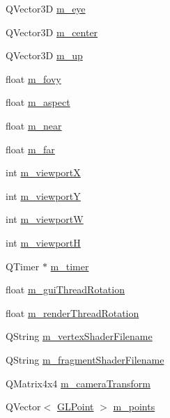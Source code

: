 \begin{DoxyCompactItemize}
\item 
Q\+Vector3D \mbox{\hyperlink{class_g_l_item_a586ce733c3f1509966d0d0aaf7edde0d}{m\+\_\+eye}}
\item 
Q\+Vector3D \mbox{\hyperlink{class_g_l_item_a2dc1570f2e0680183451cb59545c0c94}{m\+\_\+center}}
\item 
Q\+Vector3D \mbox{\hyperlink{class_g_l_item_abeb358b4ad8161c9837e875fe19da5ee}{m\+\_\+up}}
\item 
float \mbox{\hyperlink{class_g_l_item_a77f1d70315398888649ae325745cec2d}{m\+\_\+fovy}}
\item 
float \mbox{\hyperlink{class_g_l_item_a497f7f25c40790bf88b354b6ea432512}{m\+\_\+aspect}}
\item 
float \mbox{\hyperlink{class_g_l_item_ac811c5b957f441dedd62736a8feecb80}{m\+\_\+near}}
\item 
float \mbox{\hyperlink{class_g_l_item_ad5271d1dadd0691f4312fffe609ed93f}{m\+\_\+far}}
\item 
int \mbox{\hyperlink{class_g_l_item_a6f01d6d9f59a2c151ba7ceef071b1689}{m\+\_\+viewportX}}
\item 
int \mbox{\hyperlink{class_g_l_item_ae80eb4ae45d65460db5535598b54a873}{m\+\_\+viewportY}}
\item 
int \mbox{\hyperlink{class_g_l_item_a7941d53165e82da781e98f1523d1189c}{m\+\_\+viewportW}}
\item 
int \mbox{\hyperlink{class_g_l_item_a7b4451d24045e056aed2e395174714e0}{m\+\_\+viewportH}}
\item 
Q\+Timer $\ast$ \mbox{\hyperlink{class_g_l_item_a6c60908bebbb5d5089f363b425d9a744}{m\+\_\+timer}}
\item 
float \mbox{\hyperlink{class_g_l_item_af234a9a0d980c8e96fe04cc35c96e9df}{m\+\_\+gui\+Thread\+Rotation}}
\item 
float \mbox{\hyperlink{class_g_l_item_a323a6e917ca9e27991ac1837efc96a3f}{m\+\_\+render\+Thread\+Rotation}}
\item 
Q\+String \mbox{\hyperlink{class_g_l_item_a669c6b22f83bc2d6739e80a8870eab57}{m\+\_\+vertex\+Shader\+Filename}}
\item 
Q\+String \mbox{\hyperlink{class_g_l_item_ae589369bc5ec1439f67144f128b34405}{m\+\_\+fragment\+Shader\+Filename}}
\item 
Q\+Matrix4x4 \mbox{\hyperlink{class_g_l_item_acc7f15d8aa73d0e9f9bd4397b7f7d377}{m\+\_\+camera\+Transform}}
\item 
Q\+Vector$<$ \mbox{\hyperlink{class_g_l_point}{G\+L\+Point}} $>$ \mbox{\hyperlink{class_g_l_item_a52bdba33d8c29f43ed5506035fbcaa81}{m\+\_\+points}}

\end{DoxyCompactItemize}
